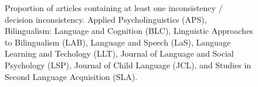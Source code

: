 \documentclass[
  doc,
  longtable,
  nolmodern,
  notxfonts,
  notimes,
  colorlinks=true,linkcolor=blue,citecolor=blue,urlcolor=blue]{apa7}
\begin{document}
\begin{figure}[H]

\caption{\label{fig-stacked-bar}Proportion of articles containing at
least one inconsistency / decision inconsistency. Applied
Psycholinguistics (APS), Bilingualism: Language and Cognition (BLC),
Linguistic Approaches to Bilingualism (LAB), Language and Speech (LaS),
Language Learning and Techology (LLT), Journal of Language and Social
Psychology (LSP), Journal of Child Language (JCL), and Studies in Second
Language Acquisition (SLA).}


\end{figure}%
\end{document}
